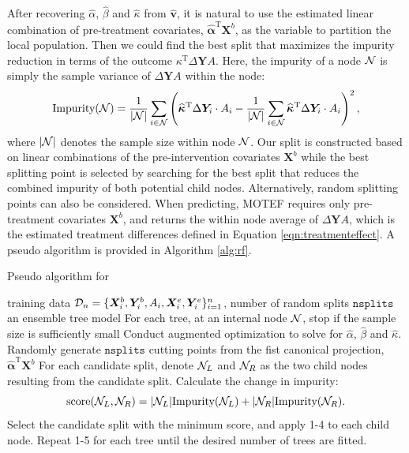 \documentclass[smallextended]{svjour3}
\newcommand{\trnp}{^\text{T}}
\begin{document}
After recovering $\widehat \alpha$, $\widehat \beta$ and $\widehat \kappa$ from $\widehat{\bm{v}}$, it is natural to use the estimated linear combination of pre-treatment covariates, $\bm{\hat{\alpha}}\trnp \bm X^b$, as the variable to partition the local population. Then we could find the best split that maximizes the impurity reduction in terms of the outcome $\kappa\trnp \Delta \bm{Y}A$. Here, the impurity of a node $\cal N$ is simply the sample variance of $\Delta \bm{Y} A$ within the node:
\[
    \text{Impurity}({\cal N})  = \frac{1}{|\cal N|}\sum_{i \in {\cal N}} \left(\bm{\widehat{\kappa}}\trnp \Delta \bm{Y}_i \cdot A_i - \frac{1}{|\cal N|}\sum_{i \in \cal N} \bm{\widehat{\kappa}}\trnp \Delta \bm{Y}_i \cdot A_i\right)^2,
\]
where $|{\cal N}|$ denotes the sample size within node ${\cal N}$. Our split is constructed based on linear combinations of the pre-intervention covariates $\bm{X}^b$ while the best splitting point is selected by searching for the best split that reduces the combined impurity of both potential child nodes. Alternatively, random splitting points \citep{geurts2006extremely} can also be considered. When predicting, MOTEF requires only pre-treatment covariates $\bm{X}^b$, and returns the within node average of $\Delta \bm{Y} A$, which is the estimated treatment differences defined in Equation \eqref{eqn:treatmenteffect}. A pseudo algorithm is provided in Algorithm \ref{alg:rf}.

\begin{algorithm}
    \caption{Pseudo algorithm for }
    \begin{algorithmic}[1]
        \INPUT training data ${\cal D}_n = \{\bm X^b_i, \bm Y^b_i, A_i, \bm X^e_i, \bm Y^e_i\}_{i=1}^n$, number of random splits $\texttt{nsplits}$
        \OUTPUT an ensemble tree model
        \STATE For each tree, at an internal node ${\cal N}$, stop if the sample size is sufficiently small
        \STATE Conduct augmented optimization to solve for $\widehat \alpha$, $\widehat \beta$ and $\widehat \kappa$.
        \STATE Randomly generate $\texttt{nsplits}$ cutting points from the fist canonical projection, $\bm{\hat{\alpha}}\trnp \bm X^b$ 
        \STATE For each candidate split, denote ${\cal N}_L$ and ${\cal N}_R$ as the two child nodes resulting from the candidate split. Calculate the change in impurity:
        \[
        \text{score}( {\cal N}_L, {\cal N}_R) = |{\cal N}_L| \text{Impurity}({\cal N}_L) + |{\cal N}_R|\text{Impurity}({\cal N}_R).
        \]
        \STATE Select the candidate split with the minimum score, and apply 1-4 to each child node.
        \STATE Repeat 1-5 for each tree until the desired number of trees are fitted.
    \end{algorithmic} \label{alg:rf}
\end{algorithm}
\end{document}
